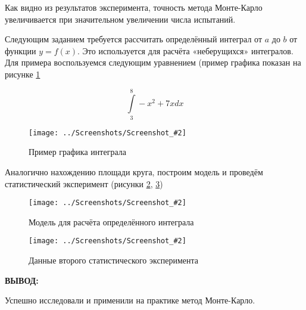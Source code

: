 \documentclass[14pt,a4paper]{extreport}
\newcommand{\screenshot}[2]{\begin{figure}[ht]%
\centering\texttt{[image: ../Screenshots/Screenshot\_\#2]}%
\caption{#1}%
\label{picture#2}%
\end{figure}%
}
\newcommand{\header}[1]{%
{
\clearpage%
\fontsize{16pt}{14pt}\selectfont
\begin{center}
\textbf{\MakeUppercase{#1}:}
\end{center}
}
}
\begin{document}
Как видно из результатов эксперимента, точность метода Монте-Карло 	увеличивается при значительном увеличении числа испытаний.

\clearpage

Следующим заданием требуется рассчитать определённый интеграл от $a$ до $b$ от функции $y = f(x)$. Это используется для расчёта «неберущихся» интегралов. Для примера воспользуемся следующим уравнением (пример графика показан на рисунке \ref{picture3}

$$
	\int\limits_3^8 -x^2+7x dx
$$

\screenshot{Пример графика интеграла}{3}

Аналогично нахождению площади круга, построим модель и проведём 	статистический эксперимент (рисунки \ref{picture4}, \ref{picture5})

\screenshot{Модель для расчёта определённого интеграла}{4}
\screenshot{Данные второго статистического эксперимента}{5}

\clearpage
\header{Вывод}

Успешно исследовали и применили на практике метод Монте-Карло.
\end{document}
